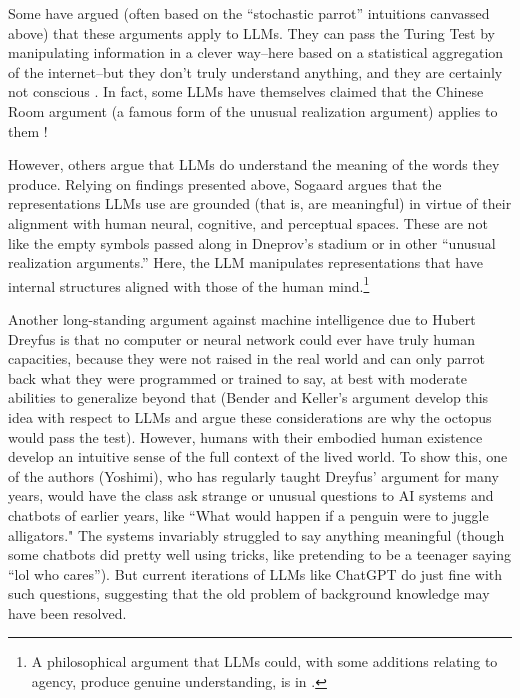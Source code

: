Some have argued (often based on the ``stochastic parrot'' intuitions canvassed
above) that these arguments apply to LLMs. They can pass the Turing Test by
manipulating information in a clever way--here based on a statistical
aggregation of the internet--but they don't truly understand anything, and they
are certainly not conscious \cite{hamid2023chatgpt}. In fact, some LLMs have
themselves claimed that the Chinese Room argument (a famous form of the unusual
realization argument) applies to them \cite{sep-chinese-room}! 

However, others argue that LLMs do understand the meaning of the words they
produce. Relying on findings presented above, Sogaard
\cite{sogaard2023grounding} argues that the representations LLMs use are
grounded (that is, are meaningful) in virtue of their alignment with human
neural, cognitive, and perceptual spaces. These are not like the empty symbols
passed along in Dneprov's stadium or in other ``unusual realization
arguments.'' Here, the LLM manipulates representations that have internal
structures aligned with those of the human mind.\footnote{A philosophical
argument that LLMs could, with some additions relating to agency, produce
genuine understanding, is in \cite{borg2025llms}.} 

Another long-standing argument against machine intelligence due to Hubert
Dreyfus \cite{dreyfus1992computers} is that no computer or neural network could
ever have truly human capacities, because they were not raised in the real
world and can only parrot back what they were programmed or trained to say, at
best with moderate abilities to generalize beyond that (Bender and Keller's
argument develop this idea with respect to LLMs and argue these considerations
are why the octopus would pass the test). However, humans with their embodied
human existence develop an intuitive sense of the full context of the lived
world. To show this, one of the authors (Yoshimi), who has regularly taught
Dreyfus'  argument for many years, would have the class ask strange or unusual
questions to AI systems and chatbots of earlier years, like ``What would happen
if a penguin were to juggle alligators." The systems invariably struggled to
say anything meaningful (though some chatbots did pretty well using tricks,
like pretending to be a teenager saying ``lol who cares''). But current
iterations of LLMs like ChatGPT do just fine with such questions, suggesting
that the old problem of background knowledge may have been resolved. 

